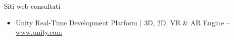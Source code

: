 \cleardoublepage
{}
{}
\nocite{*}


%

\vspace{2.5cm}
\begin{Large}Siti web consultati\end{Large}
\begin{itemize}
    \item Unity Real-Time Development Platform | 3D, 2D, VR \& AR Engine -- \url{www.unity.com}
\end{itemize}

